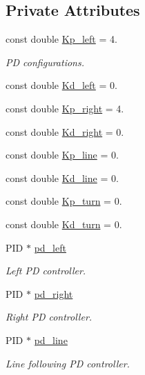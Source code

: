\subsection*{Private Attributes}
\begin{DoxyCompactItemize}
\item 
const double \hyperlink{class_drive_train_a6e48dfe233b2b5fb280032d4a68893c6}{Kp\+\_\+left} = 4.
\begin{DoxyCompactList}\small\item\em PD configurations. \end{DoxyCompactList}\item 
const double \hyperlink{class_drive_train_a1126ee729fbc3418eaa7663013650770}{Kd\+\_\+left} = 0.
\item 
const double \hyperlink{class_drive_train_a58317604093fb4fd0a29cce1d7a6c1b4}{Kp\+\_\+right} = 4.
\item 
const double \hyperlink{class_drive_train_a81fc87add62f4d2baa8627bf20949c75}{Kd\+\_\+right} = 0.
\item 
const double \hyperlink{class_drive_train_a6edead09e2ecef2ce23bf6b45bcceebb}{Kp\+\_\+line} = 0.
\item 
const double \hyperlink{class_drive_train_a7c21032f1cbaafbd53fc035d7e67ccdf}{Kd\+\_\+line} = 0.
\item 
const double \hyperlink{class_drive_train_a3500e2bb26c144a245f39d78b3fb5a8d}{Kp\+\_\+turn} = 0.
\item 
const double \hyperlink{class_drive_train_a07091d96f4ee4616c24af8f666dd2887}{Kd\+\_\+turn} = 0.
\item 
P\+ID $\ast$ \hyperlink{class_drive_train_a89603458433a6b9beffc91e6fa73f32d}{pd\+\_\+left}
\begin{DoxyCompactList}\small\item\em Left PD controller. \end{DoxyCompactList}\item 
P\+ID $\ast$ \hyperlink{class_drive_train_ab132e86e29dbc4e7d5613786658719f0}{pd\+\_\+right}
\begin{DoxyCompactList}\small\item\em Right PD controller. \end{DoxyCompactList}\item 
P\+ID $\ast$ \hyperlink{class_drive_train_ae33321a75190a321ce50d884ae6e2393}{pd\+\_\+line}
\begin{DoxyCompactList}\small\item\em Line following PD controller. \end{DoxyCompactList}\item 

\end{DoxyCompactItemize}
